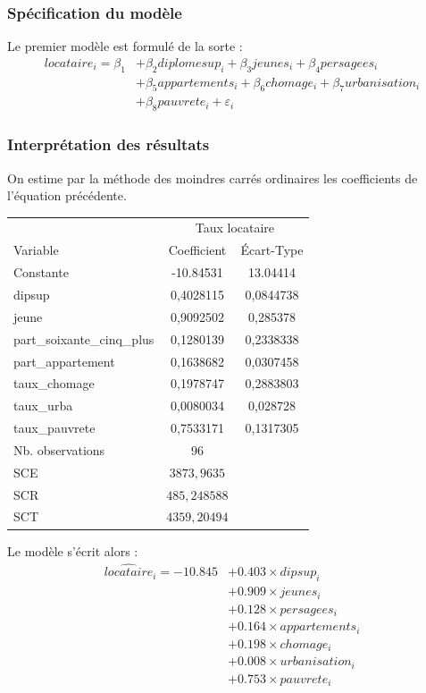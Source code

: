 \documentclass{article}
\begin{document}
\subsubsection{Spécification du modèle}
Le premier modèle est formulé de la sorte : 
\begin{equation}
\begin{split}
		locataire_i =  \beta_1 &+ \beta_2diplomesup_i + \beta_3jeunes_i + \beta_4persagees_i \\
						&+ \beta_5appartements_i + \beta_6chomage_i + \beta_7urbanisation_i \\
						&+ \beta_8pauvrete_i + \varepsilon_i 
\end{split}
\end{equation}
\subsubsection{Interprétation des résultats }
On estime par la méthode des moindres carrés ordinaires les coefficients de l'équation précédente.
\begin{table}[H]
\centering
\begin{tabular}{l*{1}{cc}}
\toprule
            &\multicolumn{2}{c}{Taux locataire}\\
Variable            & Coefficient         &  Écart-Type\\
\midrule
Constante & -10.84531 & 13.04414\\
dipsup	& 0,4028115	& 0,0844738\\
jeune  & 0,9092502 & 0,285378\\
part\_soixante\_cinq\_plus& 0,1280139 & 0,2338338\\
part\_appartement& 0,1638682 & 0,0307458\\
taux\_chomage& 0,1978747 & 0,2883803\\
taux\_urba   & 0,0080034 & 0,028728\\
taux\_pauvrete& 0,7533171& 0,1317305\\
\midrule
Nb. observations&          96         &            \\
SCE & $3873,9635$ \\
SCR & $485,248588$ \\
SCT & $4359,20494$ \\
\bottomrule
\end{tabular}
\end{table}
Le modèle s'écrit alors : 
\begin{equation*}
    \begin{split}
			\hat{locataire}_i = -10.845 &+ 0.403 \times dipsup_i \\
            &+ 0.909 \times jeunes_i \\
            &+ 0.128 \times persagees_i \\
            &+ 0.164 \times appartements_i \\
            &+ 0.198 \times chomage_i \\
            &+ 0.008 \times urbanisation_i \\
            &+ 0.753 \times pauvrete_i \\
    \end{split}
\end{equation*}
\end{document}
